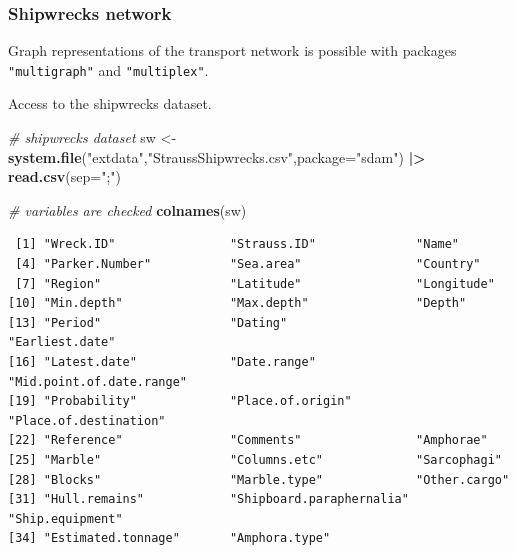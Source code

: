 \documentclass[a4paper,11pt]{memoir}
\newenvironment{Shaded}{\begin{snugshade}}{\end{snugshade}}
\newcommand{\CommentTok}[1]{\textcolor[rgb]{0.56,0.35,0.01}{\textit{#1}}}
\newcommand{\DataTypeTok}[1]{\textcolor[rgb]{0.13,0.29,0.53}{#1}}
\newcommand{\ErrorTok}[1]{\textcolor[rgb]{0.64,0.00,0.00}{\textbf{#1}}}
\newcommand{\KeywordTok}[1]{\textcolor[rgb]{0.13,0.29,0.53}{\textbf{#1}}}
\newcommand{\NormalTok}[1]{#1}
\newcommand{\OperatorTok}[1]{\textcolor[rgb]{0.81,0.36,0.00}{\textbf{#1}}}
\newcommand{\StringTok}[1]{\textcolor[rgb]{0.31,0.60,0.02}{#1}}
\begin{document}
\hypertarget{shipwrecks-network}{%
\subsubsection{Shipwrecks network}\label{shipwrecks-network}}

Graph representations of the transport network is possible with packages
\texttt{"multigraph"} and \texttt{"multiplex"}.

Access to the shipwrecks dataset.

\begin{Shaded}
\begin{Highlighting}[]
\CommentTok{# shipwrecks dataset}
\NormalTok{sw <-}\StringTok{ }\KeywordTok{system.file}\NormalTok{(}\StringTok{"extdata"}\NormalTok{,}\StringTok{"StraussShipwrecks.csv"}\NormalTok{,}\DataTypeTok{package=}\StringTok{"sdam"}\NormalTok{) }\OperatorTok{|}\ErrorTok{>}\StringTok{ }
\StringTok{  }\KeywordTok{read.csv}\NormalTok{(}\DataTypeTok{sep=}\StringTok{";"}\NormalTok{)}
\end{Highlighting}
\end{Shaded}

\begin{Shaded}
\begin{Highlighting}[]
\CommentTok{# variables are checked}
\KeywordTok{colnames}\NormalTok{(sw)}
\end{Highlighting}
\end{Shaded}

\begin{verbatim}
 [1] "Wreck.ID"                "Strauss.ID"              "Name"                   
 [4] "Parker.Number"           "Sea.area"                "Country"                
 [7] "Region"                  "Latitude"                "Longitude"              
[10] "Min.depth"               "Max.depth"               "Depth"                  
[13] "Period"                  "Dating"                  "Earliest.date"          
[16] "Latest.date"             "Date.range"              "Mid.point.of.date.range"
[19] "Probability"             "Place.of.origin"         "Place.of.destination"   
[22] "Reference"               "Comments"                "Amphorae"               
[25] "Marble"                  "Columns.etc"             "Sarcophagi"             
[28] "Blocks"                  "Marble.type"             "Other.cargo"            
[31] "Hull.remains"            "Shipboard.paraphernalia" "Ship.equipment"         
[34] "Estimated.tonnage"       "Amphora.type"           
\end{verbatim}
\end{document}
